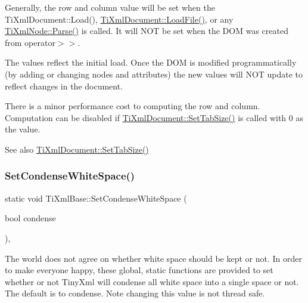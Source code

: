 Generally, the row and column value will be set when the Ti\+Xml\+Document\+::\+Load(), \hyperlink{class_ti_xml_document_a4c852a889c02cf251117fd1d9fe1845f}{Ti\+Xml\+Document\+::\+Load\+File()}, or any \hyperlink{class_ti_xml_base_a00e4edb0219d00a1379c856e5a1d2025}{Ti\+Xml\+Node\+::\+Parse()} is called. It will N\+OT be set when the D\+OM was created from operator$>$$>$.

The values reflect the initial load. Once the D\+OM is modified programmatically (by adding or changing nodes and attributes) the new values will N\+OT update to reflect changes in the document.

There is a minor performance cost to computing the row and column. Computation can be disabled if \hyperlink{class_ti_xml_document_a51dac56316f89b35bdb7d0d433ba988e}{Ti\+Xml\+Document\+::\+Set\+Tab\+Size()} is called with 0 as the value.

\begin{DoxySeeAlso}{See also}
\hyperlink{class_ti_xml_document_a51dac56316f89b35bdb7d0d433ba988e}{Ti\+Xml\+Document\+::\+Set\+Tab\+Size()} 
\end{DoxySeeAlso}
\mbox{\label{class_ti_xml_base_a0f799ec645bfb8d8a969e83478f379c1}} 
\subsubsection{\texorpdfstring{Set\+Condense\+White\+Space()}{SetCondenseWhiteSpace()}}
{\footnotesize\ttfamily static void Ti\+Xml\+Base\+::\+Set\+Condense\+White\+Space (\begin{DoxyParamCaption}\item[{bool}]{condense }\end{DoxyParamCaption})\hspace{0.3cm}{\ttfamily [inline]}, {\ttfamily [static]}}

The world does not agree on whether white space should be kept or not. In order to make everyone happy, these global, static functions are provided to set whether or not Tiny\+Xml will condense all white space into a single space or not. The default is to condense. Note changing this value is not thread safe. \mbox{\label{class_ti_xml_base_ac6b3e0f790930d4970ec30764e937b5d}} 
